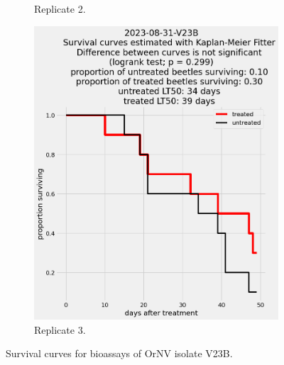 \documentclass[12pt,letterpaper,english,bibliography=totocnumbered, abstract=on]{scrartcl}
\begin{document}
\begin{figure}[h]
\begin{subfigure}{.3\textwidth}
		\caption{Replicate 2.}
	\end{subfigure}
	\begin{subfigure}{.3\textwidth}
		\includegraphics[width=\textwidth]{images/survival_curves/2023-08-31-V23B}
		\caption{Replicate 3.}
	\end{subfigure}
	\caption{Survival curves for bioassays of OrNV isolate V23B.}
	\label{fig:V23B survival curves}
\end{figure}

\end{document}
